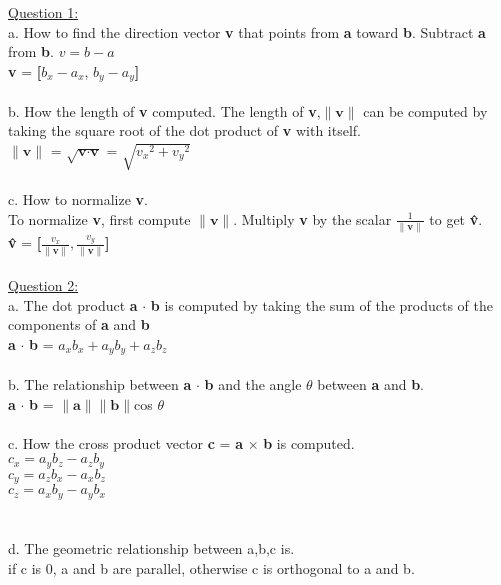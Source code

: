 \documentclass[12pt]{article}\usepackage{amsmath}
\begin{document}
\author{Joel Anna<annajoel@pdx.edu>}
\noindent
\underline{Question 1:}\\
a. How to find the direction vector \textbf{v} that points from \textbf{a} toward \textbf{b}.
Subtract \textbf{a} from \textbf{b}. $v = b - a$ \\
\textbf{v} = \textbf{[}$b_{\textit{x}}-a_{\textit{x}}$, $ b_{\textit{y}}-a_{\textit{y}}$\textbf{]}
\\\\
b. How the length of \textbf{v} computed.
The length of \textbf{v},$\|\textbf{v}\|$ can be computed by taking the square root of the dot product of \textbf{v} with itself.\\
$\|\textbf{v}\|$ = $\sqrt{\textbf{v} \cdot \textbf{v}}$ = $\sqrt{{v_x}^2 + {v_y}^2}$
\\\\
c. How to normalize \textbf{v}.\\
To normalize \textbf{v}, first compute $\|\textbf{v}\|$. Multiply \textbf{v} by the scalar $\frac{1}{\|\textbf{v}\|}$ to get \textbf{\^{v}}.\\
\textbf{\^{v}} = \textbf{[}$\frac{v_x}{\|\textbf{v}\|}, \frac{v_y}{\|\textbf{v}\|}$\textbf{]}
\\\\
\underline{Question 2:}\\
a. The dot product \textbf{a} $\cdot$ \textbf{b} is computed by taking the sum of the products of the components of \textbf{a} and \textbf{b}\\
 \textbf{a} $\cdot$ \textbf{b} = $a_{x}b_{x} + a_{y}b_{y} + a_{z}b_{z}$
 \\
 \\
 b. The relationship between \textbf{a} $\cdot$ \textbf{b} and the angle $\theta$ between \textbf{a} and \textbf{b}.\\
 \textbf{a} $\cdot$ \textbf{b} = $\|\textbf{a}\|\|\textbf{b}\|$cos $\theta$
 \\\\
 c. How the cross product vector \textbf{c} = \textbf{a} $\times$ \textbf{b} is computed.\\
$c_x = a_{y}b_{z} - a_{z}b_{y}$ \\
$c_y = a_{z}b_{x} - a_{x}b_{z}$ \\
$c_z = a_{x}b_{y} - a_{y}b_{x}$ \\
\\\\
d. The geometric relationship between a,b,c is.\\
if c is 0, a and b are parallel, otherwise c is orthogonal to a and b.
\end{document}

